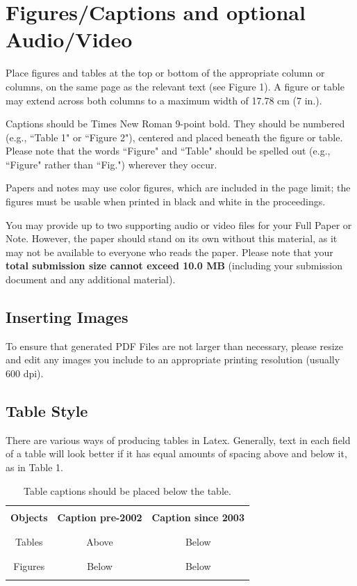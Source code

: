 \documentclass{ubicomp2013}
\begin{document}
\section{Figures/Captions and optional Audio/Video}
Place figures and tables at the top or bottom of the appropriate column or columns, on the same page as the relevant text (see Figure 1). A figure or table may extend across both columns to a maximum width of 17.78 cm (7 in.).

Captions should be Times New Roman 9-point bold.  They should be numbered (e.g., ``Table 1" or ``Figure 2"), centered and placed beneath the figure or table.  Please note that the words ``Figure" and ``Table" should be spelled out (e.g., ``Figure" rather than ``Fig.") wherever they occur.

Papers and notes may use color figures, which are included in the page limit; the figures must be usable when printed in black and white in the proceedings.

You may provide up to two supporting audio or video files for your Full Paper or Note. However, the paper should stand on its own without this material, as it may not be available to everyone who reads the paper. Please note that your \textbf{total submission size cannot exceed 10.0 MB} (including your submission document and any additional material).

\subsection{Inserting Images}
To ensure that generated PDF Files are not larger than necessary, please resize and edit any images you include to an appropriate printing resolution (usually 600 dpi).

\subsection{Table Style}
There are various ways of producing tables in Latex. Generally, text in each field of a table will look better if it has equal amounts of spacing above and below it, as in Table 1.

\begin{table}[t]
\begin{center}
\begin{tabular}{|c|c|c|}
\hline
&&\\
{\bf Objects}   &   {\bf Caption pre-2002} & {\bf Caption since 2003}\\
&&\\
\hline
&&\\
Tables & Above & Below  \\
&&\\
\hline
&&\\
Figures & Below & Below  \\
&&\\
\hline
\end{tabular}
\caption{Table captions should be placed below the table.}
\end{center}
\end{table}
\end{document}
